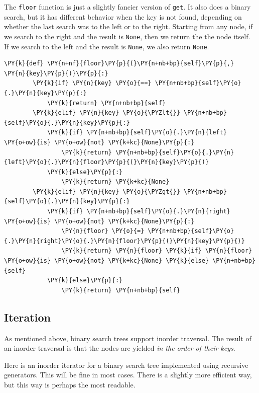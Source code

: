 The \texttt{floor} function is just a slightly fancier version of \texttt{get}.
It also does a binary search, but it has different behavior when the key is not found, depending on whether the last search was to the left or to the right.  Starting from any node, if we search to the right and the result is \texttt{None}, then we return the the node itself.
If we search to the left and the result is \texttt{None}, we also return \texttt{None}.

\begin{Verbatim}[commandchars=\\\{\}]
    \PY{k}{def} \PY{n+nf}{floor}\PY{p}{(}\PY{n+nb+bp}{self}\PY{p}{,} \PY{n}{key}\PY{p}{)}\PY{p}{:}
        \PY{k}{if} \PY{n}{key} \PY{o}{==} \PY{n+nb+bp}{self}\PY{o}{.}\PY{n}{key}\PY{p}{:}
            \PY{k}{return} \PY{n+nb+bp}{self}
        \PY{k}{elif} \PY{n}{key} \PY{o}{\PYZlt{}} \PY{n+nb+bp}{self}\PY{o}{.}\PY{n}{key}\PY{p}{:}
            \PY{k}{if} \PY{n+nb+bp}{self}\PY{o}{.}\PY{n}{left} \PY{o+ow}{is} \PY{o+ow}{not} \PY{k+kc}{None}\PY{p}{:}
                \PY{k}{return} \PY{n+nb+bp}{self}\PY{o}{.}\PY{n}{left}\PY{o}{.}\PY{n}{floor}\PY{p}{(}\PY{n}{key}\PY{p}{)}
            \PY{k}{else}\PY{p}{:}
                \PY{k}{return} \PY{k+kc}{None}
        \PY{k}{elif} \PY{n}{key} \PY{o}{\PYZgt{}} \PY{n+nb+bp}{self}\PY{o}{.}\PY{n}{key}\PY{p}{:}
            \PY{k}{if} \PY{n+nb+bp}{self}\PY{o}{.}\PY{n}{right} \PY{o+ow}{is} \PY{o+ow}{not} \PY{k+kc}{None}\PY{p}{:}
                \PY{n}{floor} \PY{o}{=} \PY{n+nb+bp}{self}\PY{o}{.}\PY{n}{right}\PY{o}{.}\PY{n}{floor}\PY{p}{(}\PY{n}{key}\PY{p}{)}
                \PY{k}{return} \PY{n}{floor} \PY{k}{if} \PY{n}{floor} \PY{o+ow}{is} \PY{o+ow}{not} \PY{k+kc}{None} \PY{k}{else} \PY{n+nb+bp}{self}
            \PY{k}{else}\PY{p}{:}
                \PY{k}{return} \PY{n+nb+bp}{self}
\end{Verbatim}




\subsection{Iteration}


As mentioned above, binary search trees support inorder traversal.  The result of an inorder traversal is that the nodes are yielded \emph{in the order of their keys}.


Here is an inorder iterator for a binary search tree implemented using recursive generators.  This will be fine in most cases.  There is a slightly more efficient way, but this way is perhaps the most readable.

